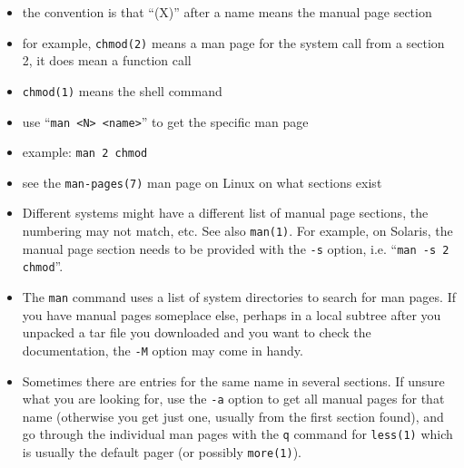 
\begin{slide}
\begin{itemize}
\item the convention is that ``(X)'' after a name means the manual page section
\item for example, \texttt{chmod(2)} means a man page for the system call from a
section 2, it does  mean a function call
\item \texttt{chmod(1)} means the shell command
\item use ``\texttt{man <N> <name>}'' to get the specific man page
\item example: \texttt{man 2 chmod}
\item see the \texttt{man-pages(7)} man page on Linux on what sections exist
\end{itemize}
\end{slide}

\begin{itemize}
\item Different systems might have a different list of manual page sections, the
numbering may not match, etc.  See also \texttt{man(1)}.  For example, on
Solaris, the manual page section needs to be provided with the \texttt{-s}
option, i.e. ``\texttt{man -s 2 chmod}''.
\item The \texttt{man} command uses a list of system directories to search for
man pages.  If you have manual pages someplace else, perhaps in a local subtree
after you unpacked a tar file you downloaded and you want to check the
documentation, the \texttt{-M} option may come in handy.
\item Sometimes there are entries for the same name in several sections.  If
unsure what you are looking for, use the \texttt{-a} option to get all manual
pages for that name (otherwise you get just one, usually from the first
section found), and go through the individual man pages with the \texttt{q}
command for \texttt{less(1)} which is usually the default pager (or possibly
\texttt{more(1)}).
\end{itemize}

\label{C_LANGUAGE}

